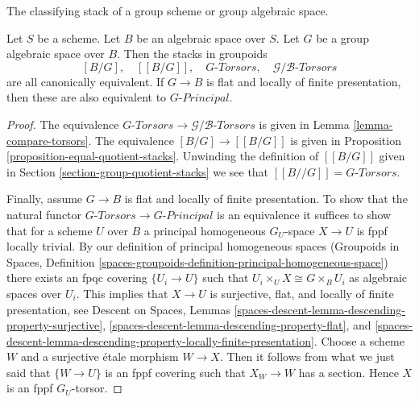 \begin{lemma}
\label{lemma-classifying-stacks}
\begin{slogan}
The classifying stack of a group scheme or group algebraic space.
\end{slogan}
Let $S$ be a scheme. Let $B$ be an algebraic space over $S$.
Let $G$ be a group algebraic space over $B$. Then the stacks
in groupoids
$$
[B/G],\quad
[[B/G]],\quad
G\textit{-Torsors},\quad
\mathcal{G}/\mathcal{B}\textit{-Torsors}
$$
are all canonically equivalent.
If $G \to B$ is flat and locally
of finite presentation, then these are also equivalent to
$G\textit{-Principal}$.
\end{lemma}

\begin{proof}
The equivalence
$G\textit{-Torsors} \to \mathcal{G}/\mathcal{B}\textit{-Torsors}$
is given in Lemma \ref{lemma-compare-torsors}.
The equivalence $[B/G] \to [[B/G]]$ is given in
Proposition \ref{proposition-equal-quotient-stacks}.
Unwinding the definition of $[[B/G]]$ given in
Section \ref{section-group-quotient-stacks}
we see that $[[B//G]] = G\textit{-Torsors}$.

\medskip\noindent
Finally, assume $G \to B$ is flat and locally of finite presentation.
To show that the natural functor
$G\textit{-Torsors} \to G\textit{-Principal}$ is an equivalence
it suffices to show that for a scheme $U$ over $B$
a principal homogeneous $G_U$-space $X \to U$
is fppf locally trivial. By our definition of principal homogeneous spaces
(Groupoids in Spaces,
Definition \ref{spaces-groupoids-definition-principal-homogeneous-space})
there exists an fpqc covering $\{U_i \to U\}$ such that
$U_i \times_U X \cong G \times_B U_i$ as algebraic spaces over $U_i$.
This implies that $X \to U$ is surjective, flat, and locally of finite
presentation, see
Descent on Spaces, Lemmas
\ref{spaces-descent-lemma-descending-property-surjective},
\ref{spaces-descent-lemma-descending-property-flat}, and
\ref{spaces-descent-lemma-descending-property-locally-finite-presentation}.
Choose a scheme $W$ and a surjective \'etale morphism $W \to X$.
Then it follows from what we just said that $\{W \to U\}$ is an fppf covering
such that $X_W \to W$ has a section. Hence $X$ is an fppf $G_U$-torsor.
\end{proof}

